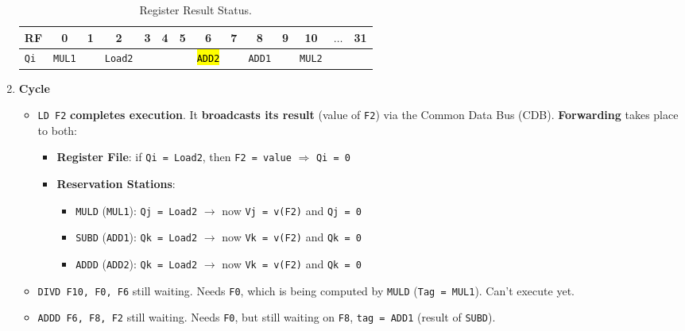 \begin{enumerate}
    \begin{table}[!htp]
        \centering
        \begin{tabular}{@{} l | c c c c c c c c c c c c c @{}}
            \toprule
            RF              & 0                     & 1             & 2                     & 3             & 4             & 5             & 6                     & 7             & 8             & 9             & 10                    & $\dots$           & 31            \\
            \midrule
            \texttt{Qi}     & \texttt{MUL1}         &               & \texttt{Load2}        &               &               &               & \hl{\texttt{ADD2}}    &               & \texttt{ADD1} &               & \texttt{MUL2}         &                   &               \\
            \bottomrule
        \end{tabular}
        \caption*{Register Result Status.}
    \end{table}

    \newpage


    \item \textbf{Cycle \theenumi}
    \begin{itemize}
        \item \texttt{LD F2} \textbf{completes execution}. It \textbf{broadcasts its result} (value of \texttt{F2}) via the Common Data Bus (CDB). \textbf{Forwarding} takes place to both:
        \begin{itemize}
            \item \textbf{Register File}: if \texttt{Qi = Load2}, then \texttt{F2 = value} $\Rightarrow$ \texttt{Qi = 0}
            \item \textbf{Reservation Stations}:
            \begin{itemize}
                \item \texttt{MULD} (\texttt{MUL1}): \texttt{Qj = Load2} $\rightarrow$ now \texttt{Vj = v(F2)} and \texttt{Qj = 0}
                \item \texttt{SUBD} (\texttt{ADD1}): \texttt{Qk = Load2} $\rightarrow$ now \texttt{Vk = v(F2)} and \texttt{Qk = 0}
                \item \texttt{ADDD} (\texttt{ADD2}): \texttt{Qk = Load2} $\rightarrow$ now \texttt{Vk = v(F2)} and \texttt{Qk = 0}
            \end{itemize}
        \end{itemize}
        \item[\textcolor{Red2}{\faIcon{times}}] \texttt{DIVD  F10, F0, F6} still waiting. Needs \texttt{F0}, which is being computed by \texttt{MULD} (\texttt{Tag = MUL1}). Can't execute yet.
        \item[\textcolor{Red2}{\faIcon{times}}] \texttt{ADDD  F6, F8, F2} still waiting. Needs \texttt{F0}, but still waiting on \texttt{F8}, \texttt{tag = ADD1} (result of \texttt{SUBD}).
    \end{itemize}


\end{enumerate}
